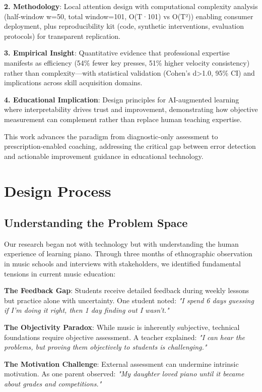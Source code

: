 \documentclass[sigconf,review,anonymous]{acmart}
\begin{document}
\textbf{2. Methodology}: Local attention design with computational complexity analysis (half-window w=50, total window=101, O(T·101) vs O(T²)) enabling consumer deployment, plus reproducibility kit (code, synthetic interventions, evaluation protocols) for transparent replication.

\textbf{3. Empirical Insight}: Quantitative evidence that professional expertise manifests as efficiency (54\% fewer key presses, 51\% higher velocity consistency) rather than complexity—with statistical validation (Cohen's d>1.0, 95\% CI) and implications across skill acquisition domains.

\textbf{4. Educational Implication}: Design principles for AI-augmented learning where interpretability drives trust and improvement, demonstrating how objective measurement can complement rather than replace human teaching expertise.

This work advances the paradigm from diagnostic-only assessment to prescription-enabled coaching, addressing the critical gap between error detection and actionable improvement guidance in educational technology.

\section{Design Process}

\subsection{Understanding the Problem Space}

Our research began not with technology but with understanding the human experience of learning piano. Through three months of ethnographic observation in music schools and interviews with stakeholders, we identified fundamental tensions in current music education:

\textbf{The Feedback Gap}: Students receive detailed feedback during weekly lessons but practice alone with uncertainty. One student noted: \textit{"I spend 6 days guessing if I'm doing it right, then 1 day finding out I wasn't."}

\textbf{The Objectivity Paradox}: While music is inherently subjective, technical foundations require objective assessment. A teacher explained: \textit{"I can hear the problems, but proving them objectively to students is challenging."}

\textbf{The Motivation Challenge}: External assessment can undermine intrinsic motivation. As one parent observed: \textit{"My daughter loved piano until it became about grades and competitions."}
\end{document}
